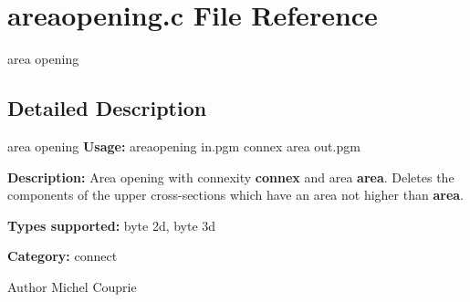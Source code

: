 \section{areaopening.c File Reference}
\label{areaopening_8c}


area opening  




\subsection{Detailed Description}
area opening {\bfseries Usage:} areaopening in.pgm connex area out.pgm

{\bfseries Description:} Area opening with connexity {\bfseries connex} and area {\bfseries area}. Deletes the components of the upper cross-\/sections which have an area not higher than {\bfseries area}.

{\bfseries Types supported:} byte 2d, byte 3d

{\bfseries Category:} connect

\begin{DoxyAuthor}{Author}
Michel Couprie 
\end{DoxyAuthor}
